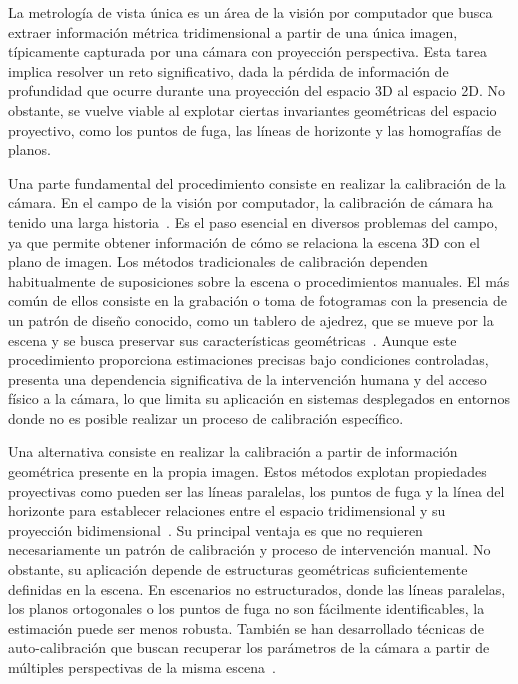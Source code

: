 La metrología de vista única es un área de la visión por computador que busca extraer información métrica
tridimensional a partir de una única imagen, típicamente capturada por una cámara con proyección perspectiva.
Esta tarea implica resolver un reto significativo, dada la pérdida de información de profundidad que ocurre
durante una proyección del espacio 3D al espacio 2D. No obstante, se vuelve viable al explotar ciertas
invariantes geométricas del espacio proyectivo, como los puntos de fuga, las líneas de horizonte y las
homografías de planos.
\par
Una parte fundamental del procedimiento consiste en realizar la calibración de la cámara. En el campo de la
visión por computador, la calibración de cámara ha tenido una larga historia~\cite{CalibrationSurvey}.
Es el paso esencial en diversos problemas del campo, ya que permite obtener información de cómo se relaciona la escena 3D
con el plano de imagen. Los métodos tradicionales de calibración dependen habitualmente de suposiciones
sobre la escena o procedimientos manuales. El más común de ellos consiste en la grabación o toma de fotogramas
con la presencia de un patrón de diseño conocido, como un tablero de ajedrez, que se mueve por la escena y
se busca preservar sus características geométricas~\cite{ManualCameraCalib,heikkila1997four}.
Aunque este procedimiento proporciona estimaciones precisas bajo condiciones controladas, presenta una dependencia
significativa de la intervención humana y del acceso físico a la cámara, lo que limita su aplicación en sistemas
desplegados en entornos donde no es posible realizar un proceso de calibración específico.
\par
Una alternativa consiste en realizar la calibración a partir de información geométrica presente en la propia imagen.
Estos métodos explotan propiedades proyectivas como pueden ser las líneas paralelas, los puntos de fuga
y la línea del horizonte para establecer relaciones entre el espacio tridimensional y su proyección bidimensional~\cite{GeometricCalibration}.
Su principal ventaja es que no requieren necesariamente un patrón de calibración y proceso de intervención manual.
No obstante, su aplicación depende de estructuras geométricas suficientemente definidas en la escena.
En escenarios no estructurados, donde las líneas paralelas, los planos ortogonales o los puntos de fuga no son fácilmente
identificables, la estimación puede ser menos robusta. También se han desarrollado técnicas de auto-calibración que buscan recuperar los parámetros de la cámara  a partir
de múltiples perspectivas de la misma escena~\cite{CameraSelfCalibration}.
